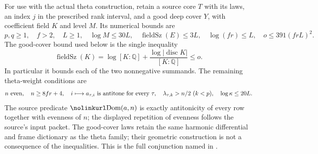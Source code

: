 For use with the actual theta construction, retain a source core
\(T\) with its laws, an index \(j\) in the prescribed rank interval,
and a good deep cover \(Y\), with coefficient field \(K\) and level
\(M\).  Its numerical bounds are
\[
 p,q\ge1,\quad f>2,\quad L\ge1,\quad
 \log M\le30L,\quad \operatorname{fieldSz}(E)\le3L,\quad
 \log(fr)\le L,\quad o\le391(frL)^2 .
\]
The good-cover bound used below is the single inequality
\[
 \operatorname{fieldSz}(K)
  =\log[K:\mathbb Q]+\frac{\log|\operatorname{disc}K|}{[K:\mathbb Q]}
                                                       \le o .
\]
In particular it bounds each of the two nonnegative summands.
The remaining theta-weight conditions are
\[
 n\ {\rm even},\quad n\ge8fr+4,\quad
 i\longmapsto a_{\tau,i}\text{ is antitone for every }\tau,\quad
 \lambda_{\tau,k}>n/2\ (k<p),\quad
 \log\kappa\le20L .
\]
The source predicate \(\srcid{Dom}(a,n)\) is exactly antitonicity
of every row together with evenness of \(n\); the displayed repetition
of evenness follows the source's input packet.
The good-cover laws retain the same harmonic differential and frame
dictionary as the theta family;
their geometric construction is not a consequence of the inequalities.
This is the full conjunction named  in
.

